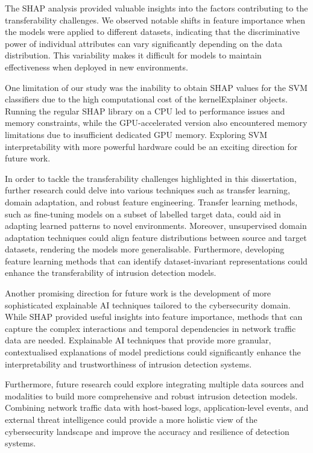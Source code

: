 The SHAP analysis provided valuable insights into the factors contributing to the transferability challenges. We observed notable shifts in feature importance when the models were applied to different datasets, indicating that the discriminative power of individual attributes can vary significantly depending on the data distribution. This variability makes it difficult for models to maintain effectiveness when deployed in new environments.

One limitation of our study was the inability to obtain SHAP values for the SVM classifiers due to the high computational cost of the kernelExplainer objects. Running the regular SHAP library on a CPU led to performance issues and memory constraints, while the GPU-accelerated version also encountered memory limitations due to insufficient dedicated GPU memory. Exploring SVM interpretability with more powerful hardware could be an exciting direction for future work.

In order to tackle the transferability challenges highlighted in this dissertation, further research could delve into various techniques such as transfer learning, domain adaptation, and robust feature engineering. Transfer learning methods, such as fine-tuning models on a subset of labelled target data, could aid in adapting learned patterns to novel environments. Moreover, unsupervised domain adaptation techniques could align feature distributions between source and target datasets, rendering the models more generalisable. Furthermore, developing feature learning methods that can identify dataset-invariant representations could enhance the transferability of intrusion detection models.

Another promising direction for future work is the development of more sophisticated explainable AI techniques tailored to the cybersecurity domain. While SHAP provided useful insights into feature importance, methods that can capture the complex interactions and temporal dependencies in network traffic data are needed. Explainable AI techniques that provide more granular, contextualised explanations of model predictions could significantly enhance the interpretability and trustworthiness of intrusion detection systems.

Furthermore, future research could explore integrating multiple data sources and modalities to build more comprehensive and robust intrusion detection models. Combining network traffic data with host-based logs, application-level events, and external threat intelligence could provide a more holistic view of the cybersecurity landscape and improve the accuracy and resilience of detection systems.


